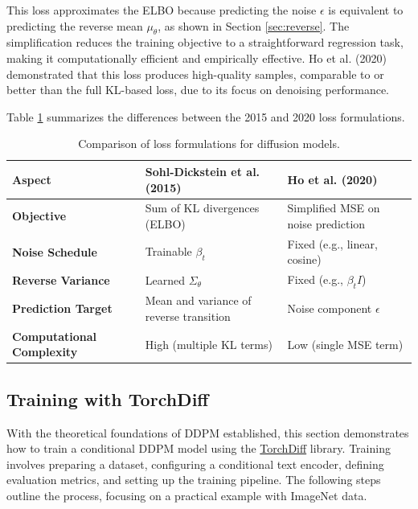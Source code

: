\documentclass[12pt]{article}
\begin{document}
This loss approximates the ELBO because predicting the noise \( \epsilon \) is equivalent to predicting the reverse mean \( \mu_\theta \), as shown in Section \ref{sec:reverse}. The simplification reduces the training objective to a straightforward regression task, making it computationally efficient and empirically effective. Ho et al. (2020) demonstrated that this loss produces high-quality samples, comparable to or better than the full KL-based loss, due to its focus on denoising performance.

Table \ref{tab:loss_comparison} summarizes the differences between the 2015 and 2020 loss formulations.

\begin{table}[htbp]
    \centering
    \caption{Comparison of loss formulations for diffusion models.}
    \label{tab:loss_comparison}
    \small %
    \begin{tabular}{p{3.5cm}|p{6cm}|p{6cm}}
        \hline
        \textbf{Aspect} & \textbf{Sohl-Dickstein et al. (2015)} & \textbf{Ho et al. (2020)} \\
        \hline
        \textbf{Objective} & Sum of KL divergences (ELBO) & Simplified MSE on noise prediction \\
        \textbf{Noise Schedule} & Trainable \( \beta_t \) & Fixed (e.g., linear, cosine) \\
        \textbf{Reverse Variance} & Learned \( \Sigma_\theta \) & Fixed (e.g., \( \beta_t I \)) \\
        \textbf{Prediction Target} & Mean and variance of reverse transition & Noise component \( \epsilon \) \\
        \textbf{Computational Complexity} & High (multiple KL terms) & Low (single MSE term) \\
        \hline
    \end{tabular}
\end{table}



\subsection{Training with TorchDiff}
\label{subsec:torchdiff_training}

With the theoretical foundations of DDPM established, this section demonstrates how to train a conditional DDPM model using the \href{https://torchdiff.readthedocs.io}{TorchDiff} library. Training involves preparing a dataset, configuring a conditional text encoder, defining evaluation metrics, and setting up the training pipeline. The following steps outline the process, focusing on a practical example with ImageNet data.
\end{document}
